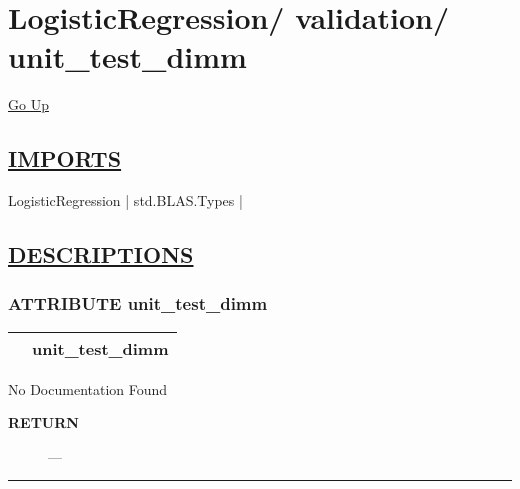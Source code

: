 \chapter*{\color{headfile}
{\large LogisticRegression\slash\hspace{0pt}}
{\large validation\slash\hspace{0pt}}
 \\
unit_test_dimm
}
\hypertarget{ecldoc:toc:LogisticRegression.validation.unit_test_dimm}{}
\hyperlink{ecldoc:toc:root/LogisticRegression/validation}{Go Up}

\section*{\underline{\textsf{IMPORTS}}}
\begin{doublespace}
{\large
LogisticRegression |
std.BLAS.Types |
}
\end{doublespace}

\section*{\underline{\textsf{DESCRIPTIONS}}}
\subsection*{\textsf{\colorbox{headtoc}{\color{white} ATTRIBUTE}
unit\_test\_dimm}}

\hypertarget{ecldoc:logisticregression.validation.unit_test_dimm}{}

{\renewcommand{\arraystretch}{1.5}
\begin{tabularx}{\textwidth}{|>{\raggedright\arraybackslash}l|X|}
\hline
\hspace{0pt}\mytexttt{\color{red} } & \textbf{unit\_test\_dimm} \\
\hline
\end{tabularx}
}

\par





No Documentation Found








\par
\begin{description}
\item [\colorbox{tagtype}{\color{white} \textbf{\textsf{RETURN}}}] \textbf{} --- 
\end{description}




\rule{\linewidth}{0.5pt}
